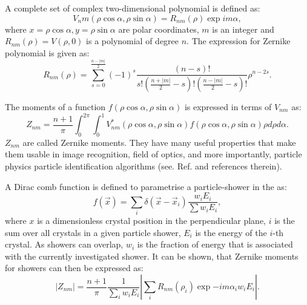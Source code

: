 A complete set of complex two-dimensional polynomial is defined as:
\begin{equation}
    V_nm(\rho\cos\alpha,\rho\sin\alpha) = R_{nm}(\rho)\exp{im\alpha},
\end{equation}
where ${x=\rho\cos\alpha, y=\rho\sin\alpha}$ are polar coordinates, $m$ is an integer and $R_{nm}(\rho)=V(\rho,0)$ is a polynomial of degree $n$.
The expression for Zernike polynomial is given as:
\begin{equation}
    R_{nm}(\rho) = \sum^{\frac{n-|m|}{2}}_{s=0}(-1)^s \frac{(n-s)!}{ s! \left(\frac{n+|m|}{2}-s \right) ! \left( \frac{n-|m|}{2}-s\right) !}\rho^{n-2s}.
\end{equation}

The moments of a function $f(\rho\cos\alpha,\rho\sin\alpha)$ is expressed in terms of $V_{nm}$ as:
\begin{equation}
    Z_{nm} = \frac{n+1}{\pi} \int_0^{2\pi}\int^1_0 V^*_{nm}(\rho\cos\alpha,\rho\sin\alpha)f(\rho\cos\alpha, \rho\sin\alpha)\rho d\rho d\alpha.
\end{equation}
$Z_{nm}$ are called Zernike moments.
They have many useful properties that make them usable in image recognition, field of optics, and more importantly, particle physics particle identification algorithms (see. Ref.\cite{Hershenhorn:2468} and references therein).

A Dirac comb function is defined to parametrise a particle-shower in the \ECL as:
\begin{equation}
    f(\vec{x}) = \sum_i \delta(\vec{x}-\vec{x}_i)\frac{w_iE_i}{\sum w_iE_i},
\end{equation}
where $x$ is a dimensionless crystal position in the perpendicular plane, $i$ is the sum over all crystals in a given particle shower, $E_i$ is the energy of the $i$-th crystal.
As showers can overlap, $w_i$ is the fraction of energy that is associated with the currently investigated shower.
It can be shown, that Zernike moments for \ECL showers can then be expressed as:
\begin{equation}
    |Z_{nm}| = \frac{n+1}{\pi}\frac{1}{\sum_iw_iE_i}\left|\sum_iR_{nm}(\rho_i)\exp{-im\alpha_i}w_iE_i\right|.
\end{equation}

